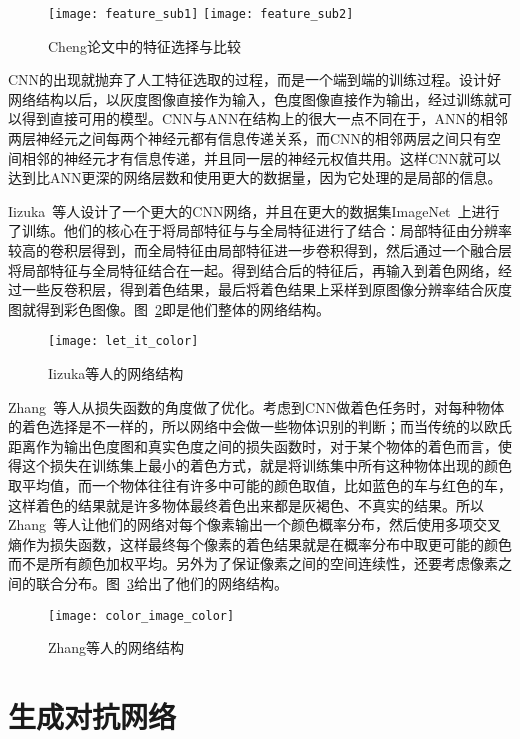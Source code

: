   \begin{figure}[h]
    \centering
      {\texttt{[image: feature\_sub1]}}
    \hspace{4em}
        {\texttt{[image: feature\_sub2]}}
    \caption{Cheng论文中的特征选择与比较}
    \label{fig:feature_choose}
  \end{figure}


  CNN的出现就抛弃了人工特征选取的过程，而是一个端到端的训练过程。设计好网络结构以后，以灰度图像直接作为输入，色度图像直接作为输出，经过训练就可以得到直接可用的模型。CNN与ANN在结构上的很大一点不同在于，ANN的相邻两层神经元之间每两个神经元都有信息传递关系，而CNN的相邻两层之间只有空间相邻的神经元才有信息传递，并且同一层的神经元权值共用。这样CNN就可以达到比ANN更深的网络层数和使用更大的数据量，因为它处理的是局部的信息。

  Iizuka~\cite{IizukaSIGGRAPH2016}等人设计了一个更大的CNN网络，并且在更大的数据集ImageNet~\cite{DBLP:journals/ijcv/RussakovskyDSKS15}上进行了训练。他们的核心在于将局部特征与与全局特征进行了结合：局部特征由分辨率较高的卷积层得到，而全局特征由局部特征进一步卷积得到，然后通过一个融合层将局部特征与全局特征结合在一起。得到结合后的特征后，再输入到着色网络，经过一些反卷积层，得到着色结果，最后将着色结果上采样到原图像分辨率结合灰度图就得到彩色图像。图~\ref{fig:let_it_color}即是他们整体的网络结构。

  \begin{figure}[H]
    \centering
    \texttt{[image: let\_it\_color]}
    \caption{Iizuka等人的网络结构}
    \label{fig:let_it_color}
  \end{figure}

  Zhang~\cite{zhang2016colorful}等人从损失函数的角度做了优化。考虑到CNN做着色任务时，对每种物体的着色选择是不一样的，所以网络中会做一些物体识别的判断；而当传统的以欧氏距离作为输出色度图和真实色度之间的损失函数时，对于某个物体的着色而言，使得这个损失在训练集上最小的着色方式，就是将训练集中所有这种物体出现的颜色取平均值，而一个物体往往有许多中可能的颜色取值，比如蓝色的车与红色的车，这样着色的结果就是许多物体最终着色出来都是灰褐色、不真实的结果。所以Zhang~\cite{zhang2016colorful}等人让他们的网络对每个像素输出一个颜色概率分布，然后使用多项交叉熵作为损失函数，这样最终每个像素的着色结果就是在概率分布中取更可能的颜色而不是所有颜色加权平均。另外为了保证像素之间的空间连续性，还要考虑像素之间的联合分布。图~\ref{fig:color_image_color}给出了他们的网络结构。

  \begin{figure}[H]
    \centering
    \texttt{[image: color\_image\_color]}
    \caption{Zhang等人的网络结构}
    \label{fig:color_image_color}
  \end{figure}

\section{生成对抗网络}
\label{sec:gan}